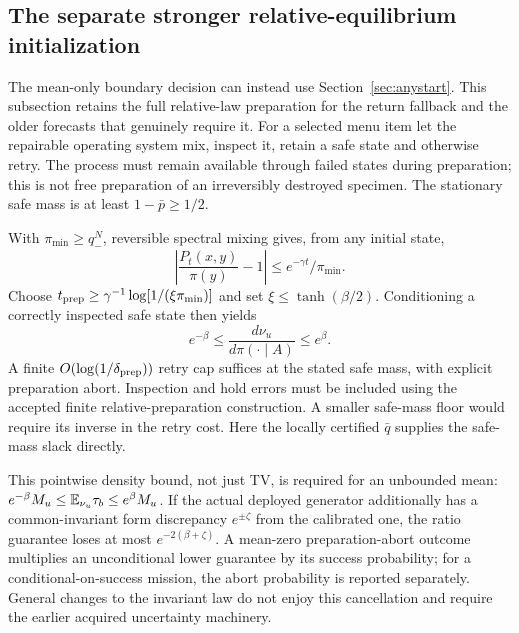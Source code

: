 \subsection{The separate stronger relative-equilibrium initialization}
The mean-only boundary decision can instead use Section~\ref{sec:anystart}.
This subsection retains the full relative-law preparation for the return
fallback and the older forecasts that genuinely require it.
For a selected menu item let the repairable operating system mix, inspect it, retain a safe state and otherwise retry. The process must remain available through failed states during preparation; this is not free preparation of an irreversibly destroyed specimen. The stationary safe mass is at least $1-\bar p\ge1/2$.

With $\pi_{
\min}\ge q_-^N$, reversible spectral mixing gives, from any initial state,
\[
 \left|\frac{P_t(x,y)}{\pi(y)}-1\right|\le e^{-\gamma t}/\pi_{
\min}.
\]
Choose $t_{
\rm prep}\ge\gamma^{-1}\log[1/(\xi\pi_{
\min})]$ and set $\xi\le\tanh(\beta/2)$. Conditioning a correctly inspected safe state then yields
\begin{equation}
 e^{-\beta}\le\frac{d\nu_u}{d\pi(\cdot\mid A)}\le e^\beta.
 \label{eq:prep}
\end{equation}
A finite $O(\log(1/\delta_{
\rm prep}))$ retry cap suffices at the stated safe mass, with explicit preparation abort. Inspection and hold errors must be included using the accepted finite relative-preparation construction. A smaller safe-mass floor would require its inverse in the retry cost. Here the locally certified $\bar q$ supplies the safe-mass slack directly.

This pointwise density bound, not just TV, is required for an unbounded mean:
$e^{-\beta}M_u\le\mathbb E_{
\nu_u}\tau_b\le e^\beta M_u$.
If the actual deployed generator additionally has a common-invariant form discrepancy $e^{\pm\zeta}$ from the calibrated one, the ratio guarantee loses at most $e^{-2(\beta+\zeta)}$. A mean-zero preparation-abort outcome multiplies an unconditional lower guarantee by its success probability; for a conditional-on-success mission, the abort probability is reported separately. General changes to the invariant law do not enjoy this cancellation and require the earlier acquired uncertainty machinery.

